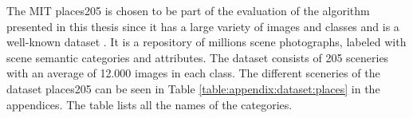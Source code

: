 The MIT places205 is chosen to be part of the evaluation of the algorithm presented in this thesis since it has a large variety of images and classes and is a well-known dataset \cite{zhou2016places}. It is a repository of millions scene photographs, labeled with scene semantic categories and attributes. The dataset consists of 205 sceneries with an average of 12.000 images in each class. 
The different sceneries of the dataset places205 can be seen in Table \ref{table:appendix:dataset:places} in the appendices. The table lists all the names of the categories. 

